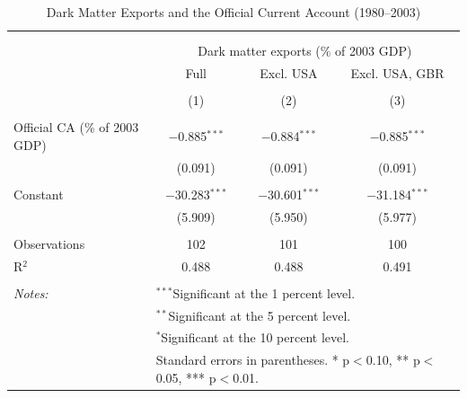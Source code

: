 \documentclass[11pt]{article}
\begin{document}
\small
\setcounter{table}{1}

\begin{table}[!htbp] \centering 
  \caption{Dark Matter Exports and the Official Current Account (1980--2003)} 
  \label{tab:table2} 
\begin{tabular}{@{\extracolsep{5pt}}lccc} 
\\[-1.8ex]\hline 
\hline \\[-1.8ex] 
\\[-1.8ex] & \multicolumn{3}{c}{Dark matter exports (\% of 2003 GDP)} \\ 
 & Full & Excl. USA & Excl. USA, GBR \\ 
\\[-1.8ex] & (1) & (2) & (3)\\ 
\hline \\[-1.8ex] 
 Official CA (\% of 2003 GDP) & $-$0.885$^{***}$ & $-$0.884$^{***}$ & $-$0.885$^{***}$ \\ 
  & (0.091) & (0.091) & (0.091) \\ 
  & & & \\ 
 Constant & $-$30.283$^{***}$ & $-$30.601$^{***}$ & $-$31.184$^{***}$ \\ 
  & (5.909) & (5.950) & (5.977) \\ 
  & & & \\ 
Observations & 102 & 101 & 100 \\ 
R$^{2}$ & 0.488 & 0.488 & 0.491 \\ 
\hline \\[-1.8ex] 
\textit{Notes:} & \multicolumn{3}{l}{$^{***}$Significant at the 1 percent level.} \\ 
 & \multicolumn{3}{l}{$^{**}$Significant at the 5 percent level.} \\ 
 & \multicolumn{3}{l}{$^{*}$Significant at the 10 percent level.} \\ 
 & \multicolumn{3}{l}{Standard errors in parentheses. * p$<$0.10, ** p$<$0.05, *** p$<$0.01.} \\ 
\end{tabular} 
\end{table} 
\end{document}
